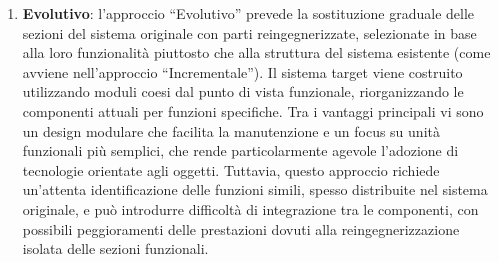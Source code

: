 \begin{enumerate}
  \item \textbf{Evolutivo}: l'approccio ``Evolutivo'' prevede la sostituzione graduale delle sezioni del sistema originale con parti reingegnerizzate, selezionate in base alla loro funzionalità piuttosto che alla struttura del sistema esistente (come avviene nell'approccio ``Incrementale''). Il sistema target viene costruito utilizzando moduli coesi dal punto di vista funzionale, riorganizzando le componenti attuali per funzioni specifiche. Tra i vantaggi principali vi sono un design modulare che facilita la manutenzione e un focus su unità funzionali più semplici, che rende particolarmente agevole l'adozione di tecnologie orientate agli oggetti. Tuttavia, questo approccio richiede un'attenta identificazione delle funzioni simili, spesso distribuite nel sistema originale, e può introdurre difficoltà di integrazione tra le componenti, con possibili peggioramenti delle prestazioni dovuti alla reingegnerizzazione isolata delle sezioni funzionali.
\end{enumerate}

